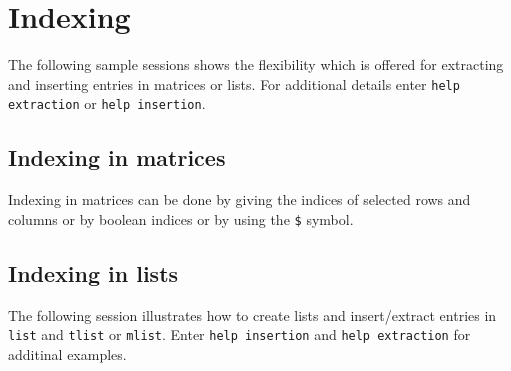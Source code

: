 \section{Indexing}

The following sample sessions shows the flexibility which is offered
for extracting and inserting entries in matrices or lists.
For additional details enter \verb!help extraction! 
or \verb!help insertion!.
\subsection{Indexing in matrices}
Indexing in matrices can be done by giving the indices of selected
rows and columns or by boolean indices or by using the \verb!$! symbol.


\subsection{Indexing in lists}
The following session illustrates how to create lists and
insert/extract entries in {\tt list} and {\tt tlist} or {\tt mlist}.
Enter {\tt help insertion} and {\tt help extraction} for additinal examples.

